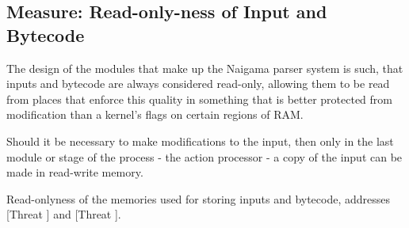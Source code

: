 \subsection{Measure: Read-only-ness of Input and Bytecode}

The design of the modules that make up the Naigama parser system is such,
that inputs and bytecode are always considered read-only, allowing them to
be read from places that enforce this quality in something that is better
protected from modification than a kernel's flags on certain regions of
RAM.

Should it be necessary to make modifications to the input, then only in
the last module or stage of the process - the action processor - a copy
of the input can be made in read-write memory.

Read-onlyness of the memories used for storing inputs and bytecode, addresses
[Threat \thethreatbcupset] and [Threat \thethreatinput].
